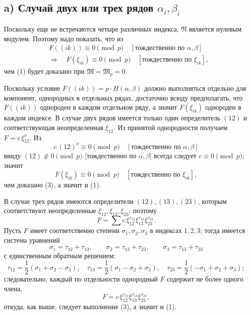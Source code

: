 \documentclass[11pt]{article}
\providecommand{\frM}{\mathfrak M}
\providecommand{\frN}{\mathfrak N}
\begin{document}
\subsection*{a) Случай двух или трех рядов \(\alpha_i,\beta_i\)}

Поскольку еще не встречаются четыре различных индекса, \(\frN\) является нулевым модулем. Поэтому надо показать, что из
\begin{equation}
\begin{aligned}
        &F((ik))\equiv0\pmod p\quad [\text{тождественно по \(\alpha,\beta\)}]\\
        &\Longrightarrow\quad
        F(\xi_{ik})\equiv0\pmod p\quad [\text{тождественно по \(\xi_{ik}\)}],
\end{aligned}
\end{equation}
чем (1) будет доказано при \(\frM=\frM_p=0\).

Поскольку условие \(F((ik))=p\cdot H(\alpha,\beta)\) должно выполняться отдельно для компонент, однородных в отдельных рядах, достаточно всюду предполагать, что \(F((ik))\) однороден в каждом отдельном ряду, а значит \(F(\xi_{ik})\) однороден в каждом индексе. В случае двух рядов имеется только один определитель \((12)\) и соответствующая неопределенная \(\xi_{12}\). Из принятой однородности получаем \(F=c\,\xi_{12}^\nu\). Из
\[
        c\,(12)^\nu\equiv0\pmod p\quad[\text{тождественно по \(\alpha,\beta\)}]
\]
ввиду \((12)\not\equiv0\pmod p\) [тождественно по \(\alpha,\beta\)] всегда следует \(c\equiv0\pmod p\); значит
\[
        F(\xi_{ik})\equiv0\pmod p\quad [\text{тождественно по \(\xi_{ik}\)}],
\]
чем доказано (3), а значит и (1).

В случае трех рядов имеются определители \((12),(13),(23)\), которым соответствуют неопределенные \(\xi_{12},\xi_{13},\xi_{23}\); поэтому
\[
        F=\sum c\,\xi_{12}^{\tau_{12}}\xi_{13}^{\tau_{13}}\xi_{23}^{\tau_{23}}.
\]
Пусть \(F\) имеет соответственно степени \(\sigma_1,\sigma_2,\sigma_3\) в индексах \(1,2,3\); тогда имеется система уравнений
\[
        \sigma_1=\tau_{12}+\tau_{13},\qquad
        \sigma_2=\tau_{12}+\tau_{23},\qquad
        \sigma_3=\tau_{13}+\tau_{23}
\]
с единственным обратным решением:
\[
        \tau_{12}=\frac12(\sigma_1+\sigma_2-\sigma_3),\quad
        \tau_{13}=\frac12(\sigma_1-\sigma_2+\sigma_3),\quad
        \tau_{23}=\frac12(-\sigma_1+\sigma_2+\sigma_3);
\]
следовательно, каждый по отдельности однородный \(F\) содержит не более одного члена,
\[
        F=c\,\xi_{12}^{\tau_{12}}\xi_{13}^{\tau_{13}}\xi_{23}^{\tau_{23}},
\]
откуда, как выше, следует выполнение (3), а значит и (1).
\end{document}
